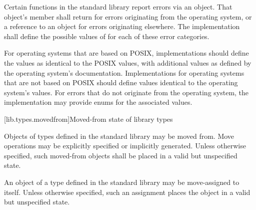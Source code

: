 \pnum
Certain functions in the \Cpp{} standard library report errors via an
 object. That object's
 member shall return  for
errors originating from the operating system, or a reference to an
  object for errors originating elsewhere.
The implementation shall define the possible values of  for each of these
error categories.
\begin{example}
For operating systems that are based on POSIX,
implementations should define the  values as
identical to the POSIX  values, with additional values as defined by the
operating system's documentation. Implementations for operating systems that are not
based on POSIX should define values identical to the operating system's
values. For errors that do not originate from the operating system, the implementation
may provide enums for the associated values.
\end{example}

[lib.types.movedfrom]{Moved-from state of library types}

\pnum
Objects of types defined in the \Cpp{} standard library may be moved
from. Move operations may be explicitly specified or
implicitly generated. Unless otherwise specified, such moved-from objects shall
be placed in a valid but unspecified state.

\pnum
An object of a type defined in the \Cpp{} standard library may be
move-assigned to itself.
Unless otherwise specified, such an assignment places the object in
a valid but unspecified state.
